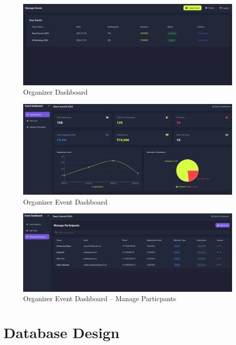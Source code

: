 \documentclass[twoside,a4paper,openright]{report} %
\begin{document}
\begin{flushleft}
	\begin{figure}[H]
		\centering
		\includegraphics[scale=0.35]{r7.jpg}
		\caption{Organizer Dashboard} %
	\end{figure}
	
	\begin{figure}[H]
		\centering
		\includegraphics[scale=0.35]{r8.jpg}   
		\caption{Organizer Event Dashboard} %
	\end{figure}
	
	\begin{figure}[H]
		\centering
		\includegraphics[scale=0.35]{r9.jpg}   
		\caption{Organizer Event Dashboard – Manage Particpants} %
	\end{figure}
	
\end{flushleft}
\section {Database Design}
\end{document}
